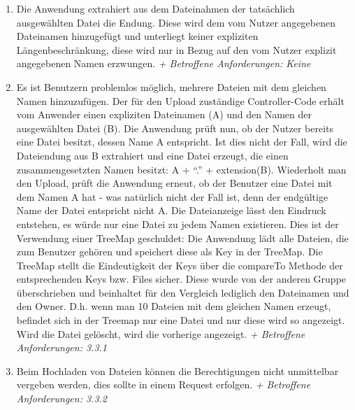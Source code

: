 \documentclass[12pt,DIV14,BCOR10mm,a4paper,parskip=half-,headsepline,headinclude,english,ngerman,bibliography=totocnumbered]{scrreprt}
\begin{document}
\begin{enumerate}
\item Die Anwendung extrahiert aus dem Dateinahmen der tatsächlich ausgewählten Datei die Endung. Diese wird dem vom Nutzer angegebenen Dateinamen hinzugefügt und unterliegt keiner expliziten  Längenbeschränkung, diese wird nur in Bezug auf den vom Nutzer explizit angegebenen Namen erzwungen.\newline
\textit{+ Betroffene Anforderungen: Keine}


\item Es ist Benutzern problemlos möglich, mehrere Dateien mit dem gleichen Namen hinzuzufügen. Der für den Upload zuständige Controller-Code erhält vom Anwender einen expliziten Dateinamen (A) und den Namen der ausgewählten Datei (B). Die Anwendung prüft nun, ob der Nutzer bereits eine Datei besitzt, dessen Name A entspricht. Ist dies nicht der Fall, wird die Dateiendung aus B extrahiert und eine Datei erzeugt, die einen zusammengesetzten Namen besitzt: A + \enquote{.} + extension(B).
Wiederholt man den Upload, prüft die Anwendung erneut, ob der Benutzer eine Datei mit dem Namen A hat - was natürlich nicht der Fall ist, denn der endgültige Name der Datei entspricht nicht A.
Die Dateianzeige lässt den Eindruck entstehen, es würde nur eine Datei zu jedem Namen existieren. Dies ist der Verwendung einer TreeMap geschuldet: Die Anwendung lädt alle Dateien, die zum Benutzer gehören und speichert diese als Key in der TreeMap. Die TreeMap stellt die Eindeutigkeit der Keys über die compareTo Methode der entsprechenden Keys bzw. Files sicher. Diese wurde von der anderen Gruppe überschrieben und beinhaltet für den Vergleich lediglich den Dateinamen und den Owner. D.h. wenn man 10 Dateien mit dem gleichen Namen erzeugt, befindet sich in der Treemap nur eine Datei und nur diese wird so angezeigt. Wird die Datei gelöscht, wird die vorherige angezeigt.\newline
\textit{+ Betroffene Anforderungen: 3.3.1}

\item Beim Hochladen von Dateien können die Berechtigungen nicht unmittelbar vergeben werden, dies sollte in einem Request erfolgen.\newline
\textit{+ Betroffene Anforderungen: 3.3.2}
  \end{enumerate}
\end{document}
